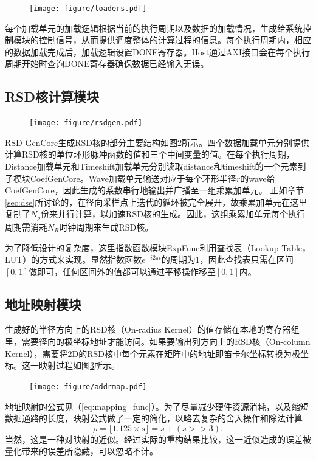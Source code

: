 \documentclass[master]{shtthesis}             %
\begin{document}
\begin{figure}[!tb]
  \centering
  \texttt{[image: figure/loaders.pdf]}
  \label{fig:loaders}
\end{figure}

每个加载单元的加载逻辑根据当前的执行周期以及数据的加载情况，生成给系统控制模块的控制信号，从而提供调度整体的计算过程的信息。每个执行周期内，相应的数据加载完成后，加载逻辑设置DONE寄存器。Host通过AXI接口会在每个执行周期开始时查询DONE寄存器确保数据已经输入无误。

\subsection{RSD核计算模块} 

\begin{figure}[!tb]
    \centering
    \texttt{[image: figure/rsdgen.pdf]}
    \label{fig:rkg}
\end{figure}

RSD GenCore生成RSD核的部分主要结构如图\ref{fig:rkg}所示。四个数据加载单元分别提供计算RSD核的单位环形脉冲函数的值和三个中间变量的值。在每个执行周期，Distance加载单元和{Timeshift}加载单元分别读取{distance}和{timeshift}的一个元素到子模块{CoefGenCore}。Wave加载单元输送对应于每个环形半径$r$的{wave}给{CoefGenCore}，因此生成的系数串行地输出并广播至一组乘累加单元。
正如章节\ref{sec:dse}所讨论的，在径向采样点上迭代的循环被完全展开，故乘累加单元在这里复制了$N_\rho$份来并行计算，以加速RSD核的生成。因此，这组乘累加单元每个执行周期需消耗$N_R$时钟周期来生成RSD核。

为了降低设计的复杂度，这里指数函数模块{ExpFunc}利用查找表（Lookup Table，LUT）的方式来实现。显然指数函数$e^{-i2\pi t}$的周期为1，因此查找表只需在区间$[0,1]$做即可，任何区间外的值都可以通过平移操作移至$[0,1]$内。

\subsection{地址映射模块}

生成好的半径方向上的RSD核（On-radius Kernel）的值存储在本地的寄存器组里，需要径向的极坐标地址才能访问。如果要输出列方向上的RSD核（On-column Kernel），需要将2D的RSD核中每个元素在矩阵中的地址即笛卡尔坐标转换为极坐标。这一映射过程如图\ref{fig:addrmap}所示。
\begin{figure}[!tb]
    \centering
    \texttt{[image: figure/addrmap.pdf]}
    \label{fig:addrmap}
\end{figure}
地址映射的公式见（\ref{eq:mapping_func}）。为了尽量减少硬件资源消耗，以及缩短数据通路的长度，映射公式做了一定的简化，以略去复杂的舍入操作和除法计算
\begin{equation}
  \rho = \lfloor 1.125 \times s\rfloor = s + (s >> 3).
\end{equation}
当然，这是一种对映射的近似。经过实际的重构结果比较，这一近似造成的误差被量化带来的误差所隐藏，可以忽略不计。
\end{document}

